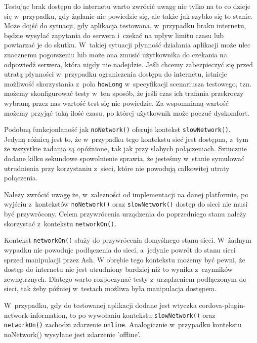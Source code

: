 \documentclass[brudnopis]{xmgr}
\begin{document}
Testując brak dostępu do internetu warto zwrócić uwagę nie tylko na to co dzieje się w~przypadku, gdy żądanie nie powiedzie się, ale także jak szybko się to stanie. Może dojść do sytuacji, gdy aplikacja testowana, w~przypadku braku internetu, będzie wysyłać zapytania do serwera i~czekać na upływ limitu czasu lub powtarzać je do skutku. W~takiej sytuacji płynność działania aplikacji może ulec znacznemu pogorszeniu lub może ona zmusić użytkownika do czekania na odpowiedź serwera, która nigdy nie nadejdzie. Jeśli chcemy zabezpieczyć się przed utratą płynności w~przypadku ograniczenia dostępu do internetu, istnieje możliwość skorzystania z~pola \texttt{howLong} w~specyfikacji scenariusza testowego, tzn. możemy skonfigurować testy w~ten sposób, że jeśli czas ich trafania przekroczy wybraną przez nas wartość test się nie powiedzie. Za wspomnianą wartość możemy przyjąć taką ilość czasu, po której użytkownik może poczuć dyskomfort. 

Podobną funkcjonlaność jak \texttt{noNetwork()} oferuje kontekst \texttt{slowNetwork()}. Jedyną różnicą jest to, że w~przypadku tego kontekstu sieć jest dostępna, z~tym że wszystkie żadania są opóźnione, tak jak przy słabych połączeniach. Sztucznie dodane kilku sekundowe spowolnienie sprawia, że jesteśmy w~stanie symulować utrudnienia przy korzystaniu z~sieci, które nie powodują całkowitej utraty połączenia. 

Należy zwrócić uwagę że, w~zależności od implementacji na danej platformie, po wyjściu z~kontekstów \texttt{noNetwork()} oraz \texttt{slowNetwork()} dostęp do sieci nie musi być przywrócony. Celem przywrócenia urządzenia do poprzedniego stanu należy skorzystać z~kontekstu \texttt{networkOn()}. 

Kontekst \texttt{networkOn()} służy do przywrócenia domyślnego stanu sieci. W~żadnym wypadku nie powoduje podłączenia do sieci, a~jedynie powrót do stanu sieci sprzed manipulacji przez Ash. W obrębie tego kontekstu możemy być pewni, że dostęp do internetu nie jest utrudniony bardziej niż to wynika z~czynników zewnętrznych. Dlatego warto rozpoczynać testy z~urządzeniem podłączonym do sieci, tak żeby później w~testach możliwa była manipulacja dostępem.

W~przypadku, gdy do testowanej aplikacji dodane jest wtyczka cordova-plugin-network-information,  to po wywołaniu kontekstu \texttt{slowNetwork()} oraz \texttt{networkOn()} zachodzi zdarzenie \texttt{online}. Analogicznie w~przypadku kontekstu noNetwork() wysyłane jest zdarzenie 'offline'. 
\end{document}

